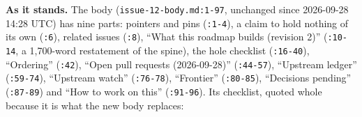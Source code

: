 \begin{sloppypar}
\textbf{As it stands.} The body (\texttt{issue-\allowbreak{}12-\allowbreak{}body.\allowbreak{}md:\allowbreak{}1-\allowbreak{}97}, unchanged since 2026-09-28 14:28 UTC) has nine parts: pointers and pins (\texttt{:\allowbreak{}1-\allowbreak{}4}), a claim to hold nothing of its own (\texttt{:\allowbreak{}6}), related issues (\texttt{:\allowbreak{}8}), ``What this roadmap builds (revision 2)'' (\texttt{:\allowbreak{}10-\allowbreak{}14}, a 1,700-word restatement of the spine), the hole checklist (\texttt{:\allowbreak{}16-\allowbreak{}40}), ``Ordering'' (\texttt{:\allowbreak{}42}), ``Open pull requests (2026-09-28)'' (\texttt{:\allowbreak{}44-\allowbreak{}57}), ``Upstream ledger'' (\texttt{:\allowbreak{}59-\allowbreak{}74}), ``Upstream watch'' (\texttt{:\allowbreak{}76-\allowbreak{}78}), ``Frontier'' (\texttt{:\allowbreak{}80-\allowbreak{}85}), ``Decisions pending'' (\texttt{:\allowbreak{}87-\allowbreak{}89}) and ``How to work on this'' (\texttt{:\allowbreak{}91-\allowbreak{}96}). Its checklist, quoted whole because it is what the new body replaces:
\end{sloppypar}

